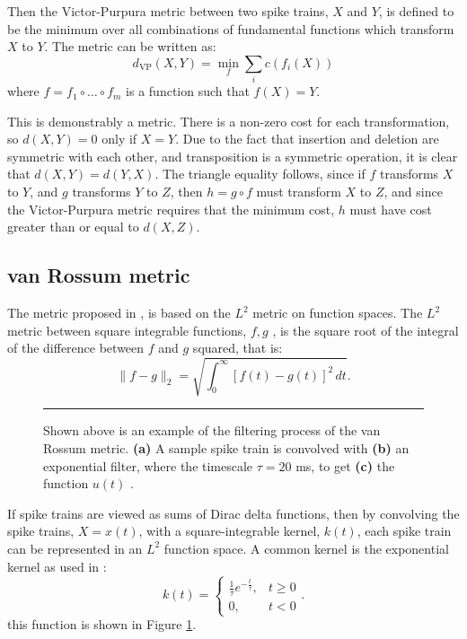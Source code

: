 Then the Victor-Purpura metric between two spike trains, $X$ and $Y$, is defined to be the minimum over all combinations of fundamental functions which transform $X$ to $Y$.  The metric can be written as:
\begin{equation}
d_{\text{VP}}(X,Y) = \min_f \sum_i c\left( f_i(X) \right)
\end{equation}
where $f=f_1\circ\ldots\circ f_m$ is a function such that $f(X) = Y$.

This is demonstrably a metric. There is a non-zero cost for each transformation, so $d(X,Y)=0$ only if $X=Y$. Due to the fact that insertion and deletion are symmetric with each other, and transposition is a symmetric operation, it is clear that $d(X,Y)=d(Y,X)$.  The triangle equality follows, since if $f$ transforms $X$ to $Y$, and $g$ transforms $Y$ to $Z$, then $h=g\circ f$ must transform $X$ to $Z$, and since the Victor-Purpura metric requires that the minimum cost, $h$ must have cost greater than or equal to $d(X,Z)$.

\subsection{van Rossum metric}

The metric proposed in 
\citep{VanRossum2001a}, is based on the $L^2$ metric on function 
spaces.  The $L^2$ metric between square integrable functions, $f,g$ , is the square root of the integral of the difference between $f$ and $g$ squared, that is:
\begin{equation}
\| f - g \|_2 = \sqrt{ \int_0^{\infty} \left[ f(t)-g(t) \right]^2 \, dt}.
\end{equation}

\begin{figure}[htb]

\bigskip
\rule{31.5em}{0.5pt}
\caption{\label{stk} Shown above is an example of the filtering process of the van Rossum metric.  {\bf (a)} A sample spike train is convolved with {\bf (b)} an exponential filter, where the timescale $\tau=20$ ms, to get {\bf (c)} the function $u(t)$ .}
\end{figure}

If spike trains are viewed as sums of Dirac delta functions, 
then by convolving the spike trains, $X=x(t)$, with 
a square-integrable kernel, $k(t)$, each spike train can be represented in an $L^2$ function space.  A common kernel is the exponential kernel as used in \citep{VanRossum2001a}:
\begin{equation}
k(t) = \left\{ \begin{array}{ll}\frac{1}{\tau}e^{-\frac{t}{\tau}}, & t\geq 0 \\
0, & t<0\end{array} \right. .
\end{equation}
this function is shown in Figure \ref{stk}.

